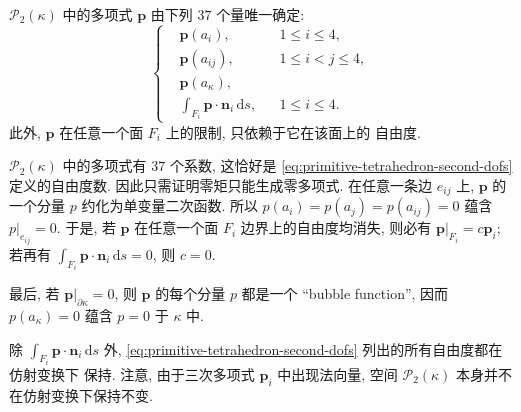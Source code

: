 \setcounter{statement}{8}
\begin{Lemma}\label{lem:primitive-tetrahedron-second-unisolvence}
$\mathcal{P}_2(\kappa)$ 中的多项式 $\mathbf p$ 由下列 $37$ 个量唯一确定:
\begin{equation}\label{eq:primitive-tetrahedron-second-dofs}
\left\{
\begin{aligned}
&\mathbf p(a_i),&&1\leq i\leq4,\\
&\mathbf p(a_{ij}),&&1\leq i<j\leq4,\\
&\mathbf p(a_\kappa),& &\\
&\int_{F_i}\mathbf p\cdot\mathbf n_i\,\mathrm ds,
&&1\leq i\leq4.
\end{aligned}
\right.
\end{equation}
此外, $\mathbf p$ 在任意一个面 $F_i$ 上的限制, 只依赖于它在该面上的
自由度.
\end{Lemma}

\begin{Proof}
$\mathcal{P}_2(\kappa)$ 中的多项式有 $37$ 个系数,
这恰好是 \eqref{eq:primitive-tetrahedron-second-dofs} 定义的自由度数.
因此只需证明零矩只能生成零多项式. 在任意一条边 $e_{ij}$ 上,
$\mathbf p$ 的一个分量 $p$ 约化为单变量二次函数. 所以
$p(a_i)=p(a_j)=p(a_{ij})=0$ 蕴含 $p|_{e_{ij}}=0$.
于是, 若 $\mathbf p$ 在任意一个面 $F_i$ 边界上的自由度均消失,
则必有 $\mathbf p|_{F_i}=c\mathbf p_i$; 若再有
$\int_{F_i}\mathbf p\cdot\mathbf n_i\,\mathrm ds=0$, 则 $c=0$.

最后, 若 $\mathbf p|_{\partial\kappa}=0$, 则 $\mathbf p$ 的每个分量
$p$ 都是一个 ``bubble function'', 因而 $p(a_\kappa)=0$ 蕴含
$p=0$ 于 $\kappa$ 中.
\end{Proof}

\setcounter{statement}{6}
\begin{Remark}\label{rem:primitive-tetrahedron-second-affine-dofs}
除 $\int_{F_i}\mathbf p\cdot\mathbf n_i\,\mathrm ds$ 外,
\eqref{eq:primitive-tetrahedron-second-dofs} 列出的所有自由度都在仿射变换下
保持. 注意, 由于三次多项式 $\mathbf p_i$ 中出现法向量,
空间 $\mathcal{P}_2(\kappa)$ 本身并不在仿射变换下保持不变.
\end{Remark}

